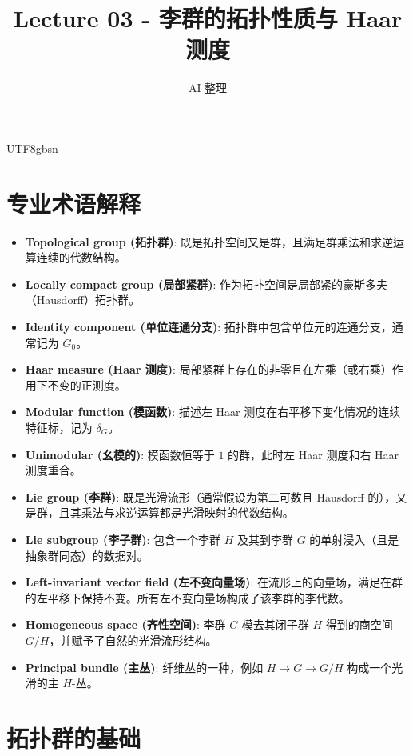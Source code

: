 \documentclass[11pt]{article}
\begin{document}
\begin{CJK*}{UTF8}{gbsn}

\title{Lecture 03 - 李群的拓扑性质与 Haar 测度}
\author{AI 整理}
\date{}
\maketitle

\section*{专业术语解释}
\begin{itemize}
    \item \textbf{Topological group (拓扑群)}: 既是拓扑空间又是群，且满足群乘法和求逆运算连续的代数结构。
    \item \textbf{Locally compact group (局部紧群)}: 作为拓扑空间是局部紧的豪斯多夫（Hausdorff）拓扑群。
    \item \textbf{Identity component (单位连通分支)}: 拓扑群中包含单位元的连通分支，通常记为 $G_0$。
    \item \textbf{Haar measure (Haar 测度)}: 局部紧群上存在的非零且在左乘（或右乘）作用下不变的正测度。
    \item \textbf{Modular function (模函数)}: 描述左 Haar 测度在右平移下变化情况的连续特征标，记为 $\delta_G$。
    \item \textbf{Unimodular (幺模的)}: 模函数恒等于 $1$ 的群，此时左 Haar 测度和右 Haar 测度重合。
    \item \textbf{Lie group (李群)}: 既是光滑流形（通常假设为第二可数且 Hausdorff 的），又是群，且其乘法与求逆运算都是光滑映射的代数结构。
    \item \textbf{Lie subgroup (李子群)}: 包含一个李群 $H$ 及其到李群 $G$ 的单射浸入（且是抽象群同态）的数据对。
    \item \textbf{Left-invariant vector field (左不变向量场)}: 在流形上的向量场，满足在群的左平移下保持不变。所有左不变向量场构成了该李群的李代数。
    \item \textbf{Homogeneous space (齐性空间)}: 李群 $G$ 模去其闭子群 $H$ 得到的商空间 $G/H$，并赋予了自然的光滑流形结构。
    \item \textbf{Principal bundle (主丛)}: 纤维丛的一种，例如 $H \to G \to G/H$ 构成一个光滑的主 $H$-丛。
\end{itemize}

\section{拓扑群的基础}


\end{CJK*}
\end{document}
